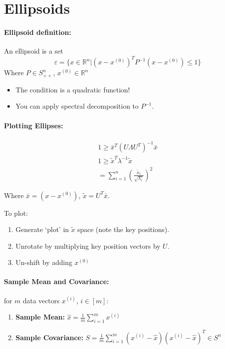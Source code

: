 \documentclass[a4paper,12pt]{report}
\def\reals{\mathbb{R}}
\begin{document}
\section{Ellipsoids}

\paragraph{Ellipsoid definition: } An ellipsoid is a set \begin{equation}
\varepsilon = \{x \in \reals^n | (x-x^{(0)})^T P^{-1} (x-x^{(0)}) \leq 1\}
\end{equation}
Where $P\in S^n_{++}$, $x^{(0)} \in \reals^n$
\begin{itemize}
\item The condition is a quadratic function!
\item You can apply spectral decomposition to $P^{-1}$.
\end{itemize}

\paragraph{Plotting Ellipses: } 
\begin{equation}
\begin{split}
1 \geq \bar{x}^T(U\Lambda U^T)^{-1} \bar{x} \\
1 \geq \tilde{x}^T \lambda^{-1} \tilde{x} \\
= \sum_{i=1}^{n} (\frac{\tilde{x}_i}{\sqrt{\lambda_i}})^2
\end{split}
\end{equation}

Where $\bar{x} = (x-x^{(0)})$, $\tilde{x} = U^T\bar{x}$.

To plot:
\begin{enumerate}
\item Generate `plot' in $\tilde{x}$ space (note the key positions).
\item Unrotate by multiplying key position vectors by $U$.
\item Un-shift by adding $x^{(0)}$
\end{enumerate}


\paragraph{Sample Mean and Covariance: } for $m$ data vectors $x^{(i)}$, $i\in[m]$:
\begin{enumerate}
\item \textbf{Sample Mean: } $\hat{x} = \frac{1}{m} \sum_{i=1}^{m} x^{(i)}$
\item \textbf{Sample Covariance: } $S = \frac{1}{m} \sum_{i=1}^{m} (x^{(i)} - \hat{x})(x^{(i)} -\hat{x})^T \in S^n$
\end{enumerate}
\end{document}
